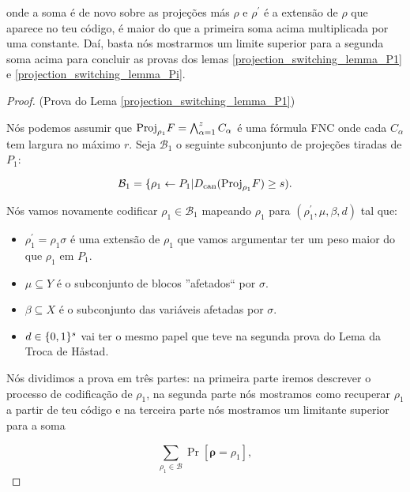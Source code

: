 onde a soma é de novo sobre as projeções más $\rho$ e $\rho^{\prime}$ é a extensão de $\rho$ que aparece no teu código, é maior do que a primeira soma acima multiplicada por uma constante. Daí, basta nós mostrarmos um limite superior para a segunda soma acima para concluir as provas dos lemas \ref{projection_switching_lemma_P1} e \ref{projection_switching_lemma_Pi}.

\begin{proof} (Prova do Lema \ref{projection_switching_lemma_P1})

Nós podemos assumir que $\text{Proj}_{\rho_{1}}F = \bigwedge_{\alpha = 1}^{z} C_{\alpha}$ é uma fórmula FNC onde cada $C_{\alpha}$ tem largura no máximo $r$. Seja $\mathcal{B}_{1}$ o seguinte subconjunto de projeções tiradas de $P_{1}$:

\begin{equation*}
	\mathcal{B}_{1} = \{ \rho_{1} \leftarrow P_{1} \lvert D_{\text{can}}(\text{Proj}_{\rho_{1}}F) \geq s).
\end{equation*}

Nós vamos novamente codificar $\rho_{1} \in \mathcal{B}_{1}$ mapeando $\rho_{1}$ para $(\rho_{1}^{\prime}, \mu, \beta, d)$ tal que:

\begin{itemize}

	\item $\rho_{1}^{\prime} = \rho_{1}\sigma$ é uma extensão de $\rho_{1}$ que vamos argumentar ter um peso maior do que $\rho_{1}$ em $P_{1}$.
	
	\item $\mu \subseteq Y$ é o subconjunto de blocos ''afetados`` por $\sigma$.
	
	\item $\beta \subseteq X$ é o subconjunto das variáveis afetadas por $\sigma$.
	
	\item $d \in \{0, 1\}^{s}$ vai ter o mesmo papel que teve na segunda prova do Lema da Troca de Håstad.
	
\end{itemize}

Nós dividimos a prova em três partes: na primeira parte iremos descrever o processo de codificação de $\rho_{1}$, na segunda parte nós mostramos como recuperar $\rho_{1}$ a partir de teu código e na terceira parte nós mostramos um limitante superior para a soma

\begin{equation} \label{projection_switching_lemma_proof_sum}
	\sum_{\rho_{1} \in \mathcal{B}} \Pr[\boldsymbol{\rho} = \rho_{1}],
\end{equation}


\end{proof}

